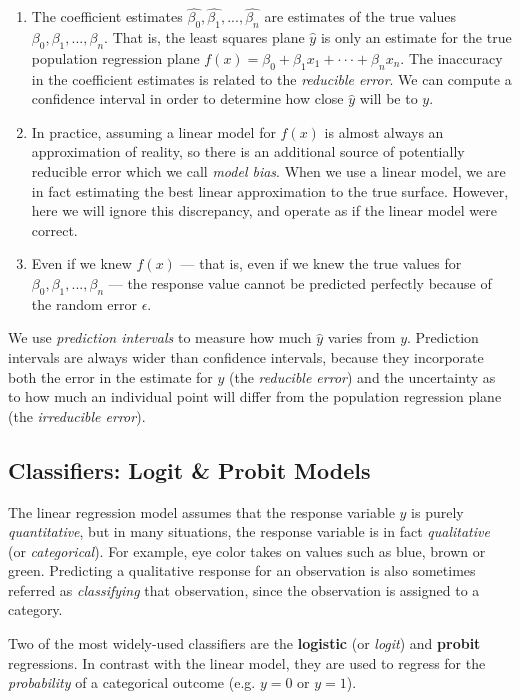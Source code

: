 \begin{enumerate}
    \item The coefficient estimates $\hat{\beta_0}, \hat{\beta_1}, ..., \hat{\beta_n}$ are estimates of the true values $\beta_0, \beta_1, ..., \beta_n$. That is, the least squares plane $\hat{y}$ is only an estimate for the true population regression plane $f(x) = \beta_0 + \beta_1 x_1 + ··· + \beta_n x_n$. The inaccuracy in the coefficient estimates is related to the \textit{reducible error}. We can compute a confidence interval in order to determine how close $\hat{y}$ will be to $y$.

    \item In practice, assuming a linear model for $f(x)$ is almost always an approximation of reality, so there is an additional source of potentially reducible error which we call \textit{model bias}. When we use a linear model, we are in fact estimating the best linear approximation to the true surface. However, here we will ignore this discrepancy, and operate as if the linear model were correct.

    \item Even if we knew $f(x)$ --- that is, even if we knew the true values for $\beta_0, \beta_1, ..., \beta_n$ --- the response value cannot be predicted perfectly because of the random error $\epsilon$.
\end{enumerate}

We use \textit{prediction intervals} to measure how much $\hat{y}$ varies from $y$. Prediction intervals are always wider than confidence intervals, because they incorporate both the error in the estimate for $y$ (the \textit{reducible error}) and the uncertainty as to how much an individual point will differ from the population regression plane (the \textit{irreducible error}).


\subsection{Classifiers: Logit \& Probit Models}
The linear regression model assumes that the response variable $y$ is purely \textit{quantitative}, but in many situations, the response variable is in fact \textit{qualitative} (or \textit{categorical}). For example, eye color takes on values such as blue, brown or green. Predicting a qualitative response for an observation is also sometimes referred as \textit{classifying} that observation, since the observation is assigned to a category.

Two of the most widely-used classifiers are the \textbf{logistic} (or \textit{logit}) and \textbf{probit} regressions. In contrast with the linear model, they are used to regress for the \textit{probability} of a categorical outcome (e.g. $y=0$ or $y=1$).

